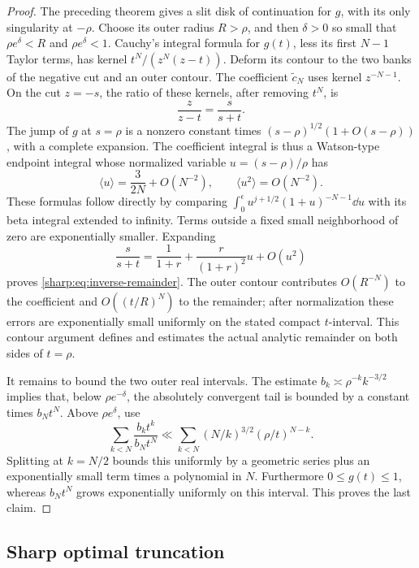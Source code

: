 \begin{proof}
The preceding theorem gives a slit disk of continuation for \(g\),
with its only singularity at \(-\rho\).
Choose its outer radius \(R>\rho\), and then \(\delta>0\) so small that
\(\rho e^\delta<R\) and \(\rho e^\delta<1\).
Cauchy's integral formula for \(g(t)\), less its first \(N-1\)
Taylor terms, has kernel \(t^N/(z^N(z-t))\). Deform its contour to the
two banks of the negative cut and an outer contour.
The coefficient \(\widetilde c_N\) uses kernel \(z^{-N-1}\).
On the cut \(z=-s\), the ratio of these kernels, after removing
\(t^N\), is
\[
 \frac{z}{z-t}=\frac{s}{s+t}.
\]
The jump of \(g\) at \(s=\rho\) is a nonzero constant times
\((s-\rho)^{1/2}(1+O(s-\rho))\), with a complete expansion.
The coefficient integral is thus a Watson-type endpoint integral
whose normalized variable \(u=(s-\rho)/\rho\) has
\[
 \langle u\rangle=\frac{3}{2N}+O(N^{-2}),
 \qquad \langle u^2\rangle=O(N^{-2}).
\]
These formulas follow directly by comparing
\(\int_0^\epsilon u^{j+1/2}(1+u)^{-N-1}\dd u\)
with its beta integral extended to infinity. Terms outside a fixed
small neighborhood of zero are exponentially smaller.
Expanding
\[
 \frac{s}{s+t}
 =\frac1{1+r}+\frac{r}{(1+r)^2}u+O(u^2)
\]
proves \eqref{sharp:eq:inverse-remainder}.
The outer contour contributes \(O(R^{-N})\) to the coefficient and
\(O((t/R)^N)\) to the remainder; after normalization these errors are
exponentially small uniformly on the stated compact \(t\)-interval.
This contour argument defines and estimates the actual analytic
remainder on both sides of \(t=\rho\).

It remains to bound the two outer real intervals.
The estimate \(b_k\asymp\rho^{-k}k^{-3/2}\) implies that, below
\(\rho e^{-\delta}\), the absolutely convergent tail is bounded by
a constant times \(b_Nt^N\). Above \(\rho e^\delta\), use
\[
 \sum_{k<N}\frac{b_kt^k}{b_Nt^N}
 \ll\sum_{k<N}(N/k)^{3/2}(\rho/t)^{N-k}.
\]
Splitting at \(k=N/2\) bounds this uniformly by a geometric series
plus an exponentially small term times a polynomial in \(N\).
Furthermore \(0\leq g(t)\leq1\), whereas \(b_Nt^N\) grows
exponentially uniformly on this interval. This proves the last claim.
\end{proof}

\subsection{Sharp optimal truncation}

